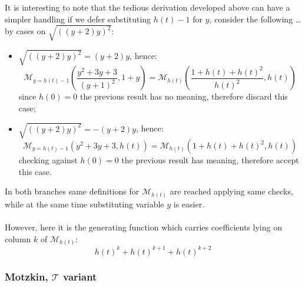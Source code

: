 It is interesting to note that the tedious derivation developed above can have
a simpler handling if we defer substituting $h(t)-1$ for $y$, consider the following \ldots
by cases on $\sqrt{\left(\left(y + 2\right) y\right)^{2}}$:
\begin{itemize}
    \item $\sqrt{\left(\left(y + 2\right) y\right)^{2}}=\left(y + 2\right) y$, hence:
        \begin{displaymath} 
            \mathcal{M}_{y=h(t)-1}\left(\frac{y^{2} + 3y + 3}{{\left(y + 1\right)}^{2}} , 1+y \right) = 
                \mathcal{M}_{h(t)}\left( \frac{1+h(t)+h(t)^2}{h(t)^2}, h(t) \right) 
        \end{displaymath} 
        since $h(0)=0$ the previous result has no meaning, therefore discard this case;
    \item $\sqrt{\left(\left(y + 2\right) y\right)^{2}}=-\left(y + 2\right) y$, hence:
        \begin{displaymath} 
            \mathcal{M}_{y=h(t)-1}\left(y^{2} + 3y + 3 , h(t) \right) = 
                \mathcal{M}_{h(t)}\left( 1+h(t)+h(t)^2, h(t) \right) 
        \end{displaymath} 
        checking against $h(0)=0$ the previous result has meaning, therefore accept this case.
\end{itemize}

In both branches same definitions for $\mathcal{M}_{h(t)}$ are reached applying
same checks, while at the same time substituting variable $y$ is easier. 
\\\\
However, here it is the generating function which carries coefficients 
lying on column $k$ of $\mathcal{M}_{h(t)}$:
\begin{displaymath} 
    h(t)^{k}+h(t)^{k+1}+h(t)^{k+2}
\end{displaymath} 


\subsubsection{Motzkin, $\mathcal{T}$ variant}

